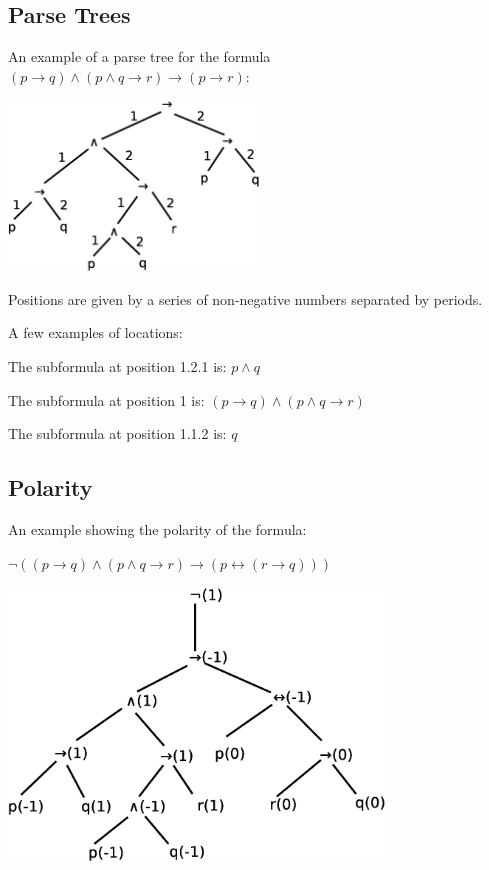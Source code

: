 \documentclass[11pt,a4paper]{article}
\begin{document}
\subsection{Parse Trees}
An example of a parse tree for the formula $(p \rightarrow q) \wedge (p \wedge q \rightarrow r) \rightarrow (p \rightarrow r)$:

\centerline{\includegraphics[width=0.5\textwidth]{ParseTreeExample.eps}}

Positions are given by a series of non-negative numbers separated by periods.

A few examples of locations:

The subformula at position 1.2.1 is: $p \wedge q$

The subformula at position 1 is: $(p \rightarrow q) \wedge (p \wedge q \rightarrow r)$

The subformula at position 1.1.2 is: $q$

\subsection{Polarity}

An example showing the polarity of the formula:

$\neg((p \rightarrow q) \wedge (p \wedge q \rightarrow r) \rightarrow (p \leftrightarrow (r \rightarrow q)))$

\centerline{\includegraphics[width=0.75\textwidth]{PolarityExample.eps}}
\end{document}
